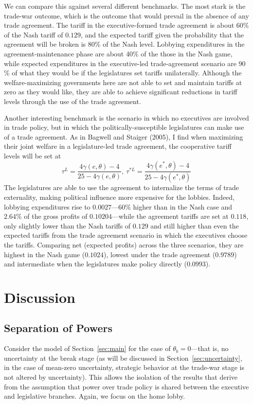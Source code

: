 \documentclass[10pt]{article}
\newcommand{\ve}{\theta}
\newcommand{\ga}{\gamma}
\begin{document}
We can compare this against several different benchmarks. The most stark is the trade-war outcome, which is the outcome that would prevail in the absence of any trade agreement. The tariff in the executive-formed trade agreement is about 60$\%$ of the Nash tariff of $0.129$, and the expected tariff given the probability that the agreement will be broken is 80$\%$ of the Nash level. Lobbying expenditures in the agreement-maintenance phase are about 40$\%$ of the those in the Nash game, while expected expenditures in the executive-led trade-agreement scenario are 90$\%$ of what they would be if the legislatures set tariffs unilaterally. Although the welfare-maximizing governments here are not able to set and maintain tariffs at zero as they would like, they are able to achieve significant reductions in tariff levels through the use of the trade agreement.

Another interesting benchmark is the scenario in which no executives are involved in trade policy, but in which the politically-susceptible legislatures can make use of a trade agreement. As in Bagwell and Staiger (2005), I find when maximizing their joint welfare in a legislature-led trade agreement, the cooperative tariff levels will be set at
\[
  \tau^L = \frac{4\ga(e,\ve)-4}{25-4\ga(e,\ve)}, \ \tau^{*L} = \frac{4\ga(e^*,\ve)-4}{25-4\ga(e^*,\ve)}
\]
The legislatures are able to use the agreement to internalize the terms of trade externality, making political influence more expensive for the lobbies. Indeed, lobbying expenditures rise to $0.0027$---60$\%$ higher than in the Nash case and $2.64\%$ of the gross profits of $0.10204$---while the agreement tariffs are set at $0.118$, only slightly lower than the Nash tariffs of $0.129$ and still higher than even the expected tariffs from the trade agreement scenario in which the executives choose the tariffs. Comparing net (expected profits) across the three scenarios, they are highest in the Nash game ($0.1024$), lowest under the trade agreement ($0.9789$) and intermediate when the legislatures make policy directly ($0.0993$).


\section{Discussion}
\label{sec:dis}

\subsection{Separation of Powers}
\label{sec:sep_powers}
Consider the model of Section~\ref{sec:main} for the case of $\ve_b=0$---that is, no uncertainty at the break stage (as will be discussed in Section~\ref{sec:uncertainty}, in the case of mean-zero uncertainty, strategic behavior at the trade-war stage is not altered by uncertainty). This allows the isolation of the results that derive from the assumption that power over trade policy is shared between the executive and legislative branches. Again, we focus on the home lobby.
\end{document}
